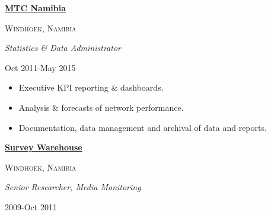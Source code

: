 \documentclass[
  letterpaper,
  DIV=11,
  numbers=noendperiod]{scrartcl}
\providecommand{\tightlist}{%
  \setlength{\itemsep}{0pt}\setlength{\parskip}{0pt}}\usepackage{longtable,booktabs,array}
\begin{document}
\vspace{5pt}

\begin{large}
  \begin{multicols}{2}
    \begin{flushleft}{\bf \href{https://www.mtc.com.na/}{MTC Namibia}}\end{flushleft}
    \begin{flushright}\textsc{Windhoek, Namibia}\end{flushright}
  \end{multicols}
  \vspace{-0.17cm}
  \begin{multicols}{2}
    \begin{flushleft}\textit{Statistics \& Data Administrator}\end{flushleft}
    \begin{flushright}Oct 2011-May 2015\end{flushright}
  \end{multicols}
\end{large}
\vspace{-0.16cm}

\begin{itemize}
\tightlist
\item
  Executive KPI reporting \& dashboards.
\item
  Analysis \& forecasts of network performance.
\item
  Documentation, data management and archival of data and reports.
\end{itemize}

\vspace{5pt}

\begin{large}
  \begin{multicols}{2}
    \begin{flushleft}{\bf \href{https://surveywarehouse.com.na/}{Survey Warehouse}}\end{flushleft}
    \begin{flushright}\textsc{Windhoek, Namibia}\end{flushright}
  \end{multicols}
  \vspace{-0.17cm}
  \begin{multicols}{2}
    \begin{flushleft}\textit{Senior Researcher, Media Monitoring}\end{flushleft}
    \begin{flushright}2009-Oct 2011\end{flushright}
  \end{multicols}
\end{large}
\vspace{-0.16cm}
\end{document}
